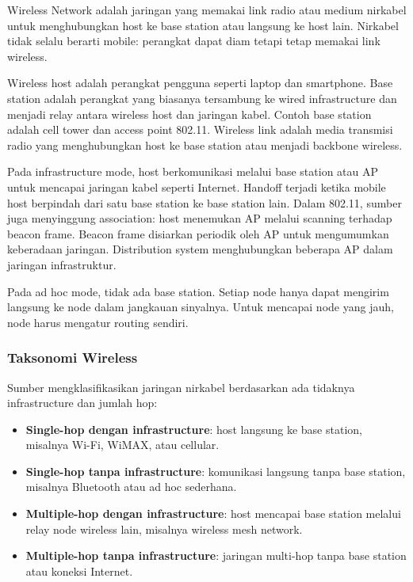 \begin{jawab}
Wireless Network adalah jaringan yang memakai link radio atau medium nirkabel untuk menghubungkan host ke base station atau langsung ke host lain. Nirkabel tidak selalu berarti mobile: perangkat dapat diam tetapi tetap memakai link wireless.
\end{jawab}

Wireless host adalah perangkat pengguna seperti laptop dan smartphone. Base station adalah perangkat yang biasanya tersambung ke wired infrastructure dan menjadi relay antara wireless host dan jaringan kabel. Contoh base station adalah cell tower dan access point 802.11. Wireless link adalah media transmisi radio yang menghubungkan host ke base station atau menjadi backbone wireless.

Pada infrastructure mode, host berkomunikasi melalui base station atau AP untuk mencapai jaringan kabel seperti Internet. Handoff terjadi ketika mobile host berpindah dari satu base station ke base station lain. Dalam 802.11, sumber juga menyinggung association: host menemukan AP melalui scanning terhadap beacon frame. Beacon frame disiarkan periodik oleh AP untuk mengumumkan keberadaan jaringan. Distribution system menghubungkan beberapa AP dalam jaringan infrastruktur.

Pada ad hoc mode, tidak ada base station. Setiap node hanya dapat mengirim langsung ke node dalam jangkauan sinyalnya. Untuk mencapai node yang jauh, node harus mengatur routing sendiri.

\subsubsection*{Taksonomi Wireless}

Sumber mengklasifikasikan jaringan nirkabel berdasarkan ada tidaknya infrastructure dan jumlah hop:

\begin{itemize}
    \item \textbf{Single-hop dengan infrastructure}: host langsung ke base station, misalnya Wi-Fi, WiMAX, atau cellular.
    \item \textbf{Single-hop tanpa infrastructure}: komunikasi langsung tanpa base station, misalnya Bluetooth atau ad hoc sederhana.
    \item \textbf{Multiple-hop dengan infrastructure}: host mencapai base station melalui relay node wireless lain, misalnya wireless mesh network.
    \item \textbf{Multiple-hop tanpa infrastructure}: jaringan multi-hop tanpa base station atau koneksi Internet.
\end{itemize}

